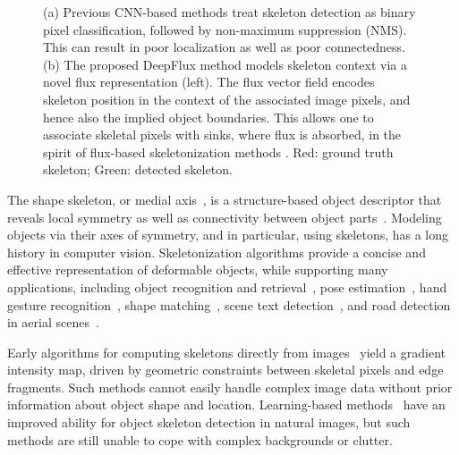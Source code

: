 \documentclass[10pt,twocolumn,letterpaper]{article}
\begin{document}
\begin{figure}
\centering
{}
\caption{(a) Previous CNN-based methods treat skeleton detection as binary pixel classification, followed by non-maximum suppression (NMS). This can result in poor localization as well as poor connectedness. (b) The proposed DeepFlux method models skeleton context via a novel flux representation (left). The flux vector field encodes skeleton position in the context of the associated image pixels, and hence also the implied object boundaries. This allows one to associate skeletal pixels with sinks, where flux is absorbed, in the spirit of flux-based skeletonization methods \cite{siddiqi2002hamilton}. Red: ground truth skeleton; Green: detected skeleton.}
\label{fig:motivation}
\end{figure}

The shape skeleton, or medial axis~\cite{blum1973biological}, is a structure-based object descriptor that reveals local symmetry as well as connectivity between object parts~\cite{marr1978representation,dickinson2009object}. Modeling
objects via their axes of symmetry, and in particular, using skeletons,
has a long history in computer vision. Skeletonization algorithms
provide a concise and effective
representation of deformable objects, while supporting many applications,
including object recognition and retrieval~\cite{zhu1996forms,felzenszwalb2005pictorial,bai2009active,trinh2011skeleton}, pose estimation~\cite{girshick2011efficient,shotton2011real,wei2016convolutional}, hand gesture recognition~\cite{ren2013robust}, shape matching~\cite{siddiqi1999shock}, scene text detection~\cite{zhang2015symmetry},
and road detection in aerial scenes~\cite{sironi2014multiscale}.



Early algorithms for computing skeletons directly from images~\cite{lindeberg1998edge,liu1998segmenting,jang2001pseudo,yu2004segmentation,nedzved2006gray,zhang2007accurate,lindeberg2013scale} yield a gradient intensity map, driven by geometric constraints between skeletal pixels and edge fragments. Such methods cannot easily handle complex image data without prior information about object shape and location. Learning-based methods~\cite{levinshtein2013multiscale,sie2013detecting,tsogkas2012mil,shen2016misl,sironi2014multiscale} have an improved ability for object skeleton detection in natural images, but such methods are still unable to cope with complex backgrounds or clutter.
\end{document}
